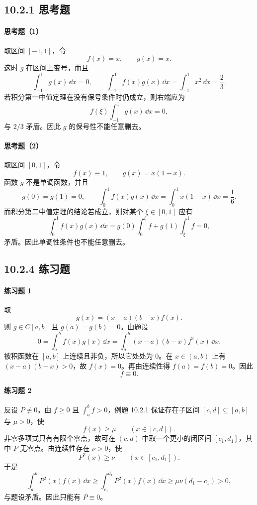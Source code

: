 \subsection*{10.2.1 思考题}

\paragraph{思考题（1）}
\begin{xsolution}
取区间 $[-1,1]$，令
\[
  f(x)=x,\qquad g(x)=x.
\]
这时 $g$ 在区间上变号，而且
\[
  \int_{-1}^1 g(x)\,\dd x=0,
  \qquad
  \int_{-1}^1 f(x)g(x)\,\dd x
  =\int_{-1}^1x^2\,\dd x=\frac23.
\]
若积分第一中值定理在没有保号条件时仍成立，则右端应为
\[
  f(\xi)\int_{-1}^1g(x)\,\dd x=0,
\]
与 $2/3$ 矛盾。因此 $g$ 的保号性不能任意删去。
\end{xsolution}

\paragraph{思考题（2）}
\begin{xsolution}
取区间 $[0,1]$，令
\[
  f(x)\equiv1,\qquad g(x)=x(1-x).
\]
函数 $g$ 不是单调函数，并且
\[
  g(0)=g(1)=0,
  \qquad
  \int_0^1f(x)g(x)\,\dd x=\int_0^1x(1-x)\,\dd x=\frac16.
\]
而积分第二中值定理的结论若成立，则对某个 $\xi\in[0,1]$ 应有
\[
  \int_0^1f(x)g(x)\,\dd x
  =g(0)\int_0^\xi f+g(1)\int_\xi^1 f=0,
\]
矛盾。因此单调性条件也不能任意删去。
\end{xsolution}

\subsection*{10.2.4 练习题}

\paragraph{练习题 1}
\begin{xsolution}
取
\[
  g(x)=(x-a)(b-x)f(x).
\]
则 $g\in C[a,b]$ 且 $g(a)=g(b)=0$。由题设
\[
  0=\int_a^b f(x)g(x)\,\dd x
  =\int_a^b(x-a)(b-x)f^2(x)\,\dd x.
\]
被积函数在 $[a,b]$ 上连续且非负，所以它处处为 $0$。在 $x\in(a,b)$ 上有 $(x-a)(b-x)>0$，故 $f(x)=0$。再由连续性得 $f(a)=f(b)=0$。因此
\[
  f\equiv0.
\]
\end{xsolution}

\paragraph{练习题 2}
\begin{xsolution}
反设 $P\not\equiv0$。由 $f\geqslant0$ 且 $\int_a^b f>0$，例题 10.2.1 保证存在子区间 $[c,d]\subseteq[a,b]$ 与 $\mu>0$，使
\[
  f(x)\geqslant\mu\qquad(x\in[c,d]).
\]
非零多项式只有有限个零点，故可在 $(c,d)$ 中取一个更小的闭区间 $[c_1,d_1]$，其中 $P$ 无零点。由连续性存在 $\nu>0$，使
\[
  P^2(x)\geqslant\nu\qquad(x\in[c_1,d_1]).
\]
于是
\[
  \int_a^bP^2(x)f(x)\,\dd x
  \geqslant\int_{c_1}^{d_1}P^2(x)f(x)\,\dd x
  \geqslant\mu\nu(d_1-c_1)>0,
\]
与题设矛盾。因此只能有 $P\equiv0$。
\end{xsolution}


